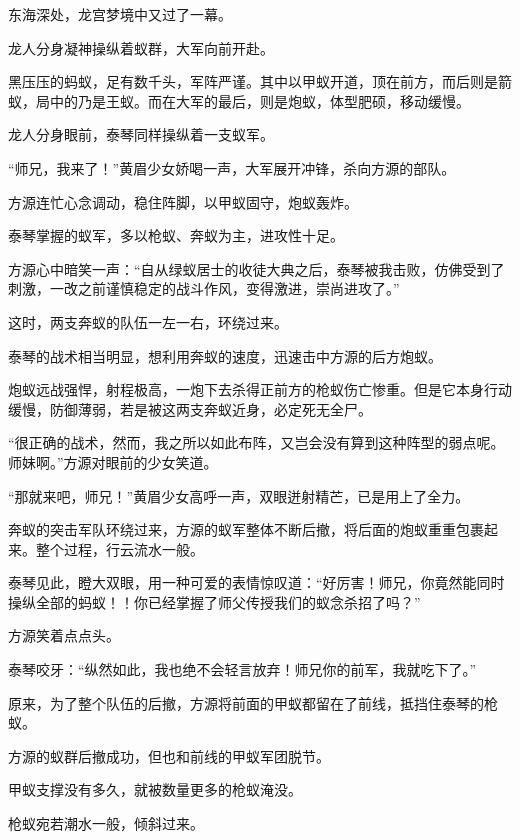 
\begin{this_body}



东海深处，龙宫梦境中又过了一幕。

龙人分身凝神操纵着蚁群，大军向前开赴。

黑压压的蚂蚁，足有数千头，军阵严谨。其中以甲蚁开道，顶在前方，而后则是箭蚁，局中的乃是王蚁。而在大军的最后，则是炮蚁，体型肥硕，移动缓慢。

龙人分身眼前，泰琴同样操纵着一支蚁军。

“师兄，我来了！”黄眉少女娇喝一声，大军展开冲锋，杀向方源的部队。

方源连忙心念调动，稳住阵脚，以甲蚁固守，炮蚁轰炸。

泰琴掌握的蚁军，多以枪蚁、奔蚁为主，进攻性十足。

方源心中暗笑一声：“自从绿蚁居士的收徒大典之后，泰琴被我击败，仿佛受到了刺激，一改之前谨慎稳定的战斗作风，变得激进，崇尚进攻了。”

这时，两支奔蚁的队伍一左一右，环绕过来。

泰琴的战术相当明显，想利用奔蚁的速度，迅速击中方源的后方炮蚁。

炮蚁远战强悍，射程极高，一炮下去杀得正前方的枪蚁伤亡惨重。但是它本身行动缓慢，防御薄弱，若是被这两支奔蚁近身，必定死无全尸。

“很正确的战术，然而，我之所以如此布阵，又岂会没有算到这种阵型的弱点呢。师妹啊。”方源对眼前的少女笑道。

“那就来吧，师兄！”黄眉少女高呼一声，双眼迸射精芒，已是用上了全力。

奔蚁的突击军队环绕过来，方源的蚁军整体不断后撤，将后面的炮蚁重重包裹起来。整个过程，行云流水一般。

泰琴见此，瞪大双眼，用一种可爱的表情惊叹道：“好厉害！师兄，你竟然能同时操纵全部的蚂蚁！！你已经掌握了师父传授我们的蚁念杀招了吗？”

方源笑着点点头。

泰琴咬牙：“纵然如此，我也绝不会轻言放弃！师兄你的前军，我就吃下了。”

原来，为了整个队伍的后撤，方源将前面的甲蚁都留在了前线，抵挡住泰琴的枪蚁。

方源的蚁群后撤成功，但也和前线的甲蚁军团脱节。

甲蚁支撑没有多久，就被数量更多的枪蚁淹没。

枪蚁宛若潮水一般，倾斜过来。


\end{this_body}
